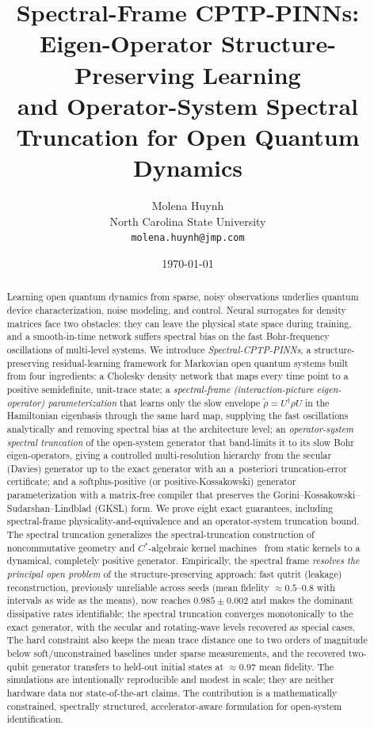 \documentclass[11pt]{article}
\title{\bfseries Spectral-Frame CPTP-PINNs: Eigen-Operator Structure-Preserving Learning\\ and Operator-System Spectral Truncation for Open Quantum Dynamics}
\author{Molena Huynh\\[3pt]
\normalsize North Carolina State University\\
\normalsize \texttt{molena.huynh@jmp.com}}
\date{\today}
\newcommand{\sync}[1]{#1}
\begin{document}
\maketitle

\begin{abstract}
Learning open quantum dynamics from sparse, noisy observations underlies quantum device characterization, noise modeling, and control. Neural surrogates for density matrices face two obstacles: they can leave the physical state space during training, and a smooth-in-time network suffers spectral bias on the fast Bohr-frequency oscillations of multi-level systems. We introduce \emph{Spectral-CPTP-PINNs}, a structure-preserving residual-learning framework for Markovian open quantum systems built from four ingredients: a Cholesky density network that maps every time point to a positive semidefinite, unit-trace state; a \emph{spectral-frame (interaction-picture eigen-operator) parameterization} that learns only the slow envelope $\widetilde\rho=U^\dagger\rho U$ in the Hamiltonian eigenbasis through the same hard map, supplying the fast oscillations analytically and removing spectral bias at the architecture level; an \emph{operator-system spectral truncation} of the open-system generator that band-limits it to its slow Bohr eigen-operators, giving a controlled multi-resolution hierarchy from the secular (Davies) generator up to the exact generator with an a~posteriori truncation-error certificate; and a softplus-positive (or positive-Kossakowski) generator parameterization with a matrix-free compiler that preserves the Gorini--Kossakowski--Sudarshan--Lindblad (GKSL) form. We prove eight exact guarantees, including spectral-frame physicality-and-equivalence and an operator-system truncation bound. The spectral truncation generalizes the spectral-truncation construction of noncommutative geometry and $C^*$-algebraic kernel machines~\cite{connes2021spectral,hashimoto2024spectral} from static kernels to a dynamical, completely positive generator. Empirically, the spectral frame \emph{resolves the principal open problem} of the structure-preserving approach: fast qutrit (leakage) reconstruction, previously unreliable across seeds (mean fidelity $\approx0.5$--$0.8$ with intervals as wide as the means), now reaches $\sync{0.985}\pm\sync{0.002}$ and makes the dominant dissipative rates identifiable; the spectral truncation converges monotonically to the exact generator, with the secular and rotating-wave levels recovered as special cases. The hard constraint also keeps the mean trace distance one to two orders of magnitude below soft/unconstrained baselines under sparse measurements, and the recovered two-qubit generator transfers to held-out initial states at $\approx0.97$ mean fidelity. The simulations are intentionally reproducible and modest in scale; they are neither hardware data nor state-of-the-art claims. The contribution is a mathematically constrained, spectrally structured, accelerator-aware formulation for open-system identification.
\end{abstract}
\end{document}
